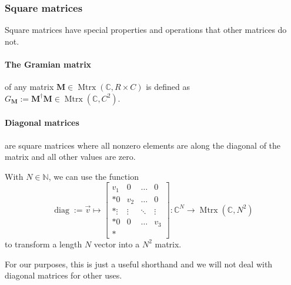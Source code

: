 \documentclass{article}
\begin{document}
\subsubsection{Square matrices}

Square matrices have special properties and operations that other matrices do not.

\paragraph{The Gramian matrix}\label{para:gramian} of any matrix $\mathbf{M} \in \operatorname{Mtrx}(\mathbb{C}, R\times C)$ is defined as $G_{\mathbf{M}} := \mathbf{M}^\dagger \mathbf{M} \in \operatorname{Mtrx}\left(\mathbb{C}, C^2\right)$.

\paragraph{Diagonal matrices}
are square matrices where all nonzero elements are along the diagonal of the matrix and all other values are zero.

With $N \in \mathbb{N}$, we can use the function
\begin{equation}
    \operatorname{diag}
    := \vec{v} \mapsto \left[
        \begin{matrix}
            v_1 & 0   & \dots & 0 \\*
            0   & v_2 & \dots & 0 \\*
            \vdots & \vdots & \ddots & \vdots \\*
            0   & 0   & \dots & v_3 \\*
        \end{matrix}
    \right]
    : \mathbb{C}^N \to \operatorname{Mtrx}\left(\mathbb{C}, N^2\right)
\end{equation}
to transform a length $N$ vector into a $N^2$ matrix.

For our purposes, this is just a useful shorthand and we will not deal with diagonal matrices for other uses.
\end{document}
